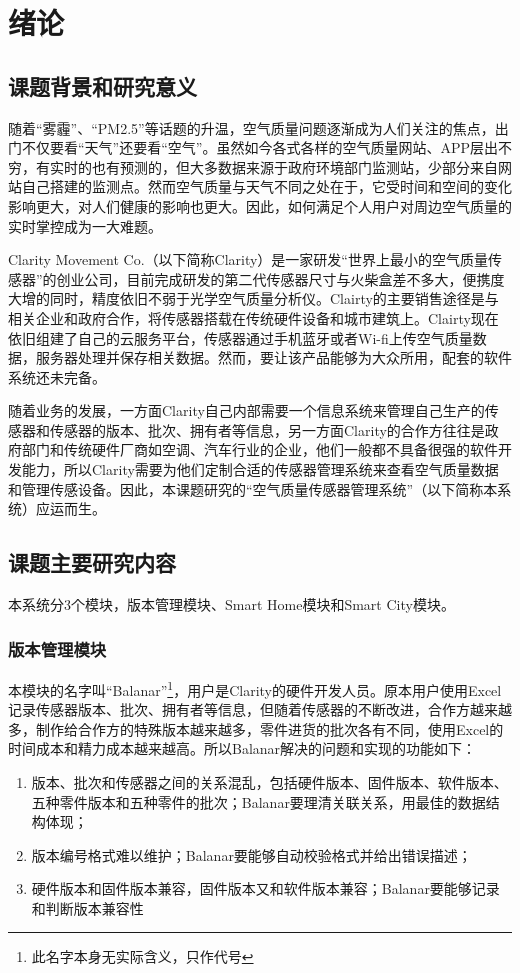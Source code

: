
\chapter{绪论}
\label{chap:intro}
\section{课题背景和研究意义}
随着“雾霾”、“PM2.5”等话题的升温，空气质量问题逐渐成为人们关注的焦点，出门不仅要看“天气”还要看“空气”。虽然如今各式各样的空气质量网站、APP层出不穷，有实时的也有预测的，但大多数据来源于政府环境部门监测站，少部分来自网站自己搭建的监测点。然而空气质量与天气不同之处在于，它受时间和空间的变化影响更大，对人们健康的影响也更大。因此，如何满足个人用户对周边空气质量的实时掌控成为一大难题。

Clarity Movement Co.（以下简称Clarity）是一家研发“世界上最小的空气质量传感器”的创业公司，目前完成研发的第二代传感器尺寸与火柴盒差不多大，便携度大增的同时，精度依旧不弱于光学空气质量分析仪。Clairty的主要销售途径是与相关企业和政府合作，将传感器搭载在传统硬件设备和城市建筑上。Clairty现在依旧组建了自己的云服务平台，传感器通过手机蓝牙或者Wi-fi上传空气质量数据，服务器处理并保存相关数据。然而，要让该产品能够为大众所用，配套的软件系统还未完备。

随着业务的发展，一方面Clarity自己内部需要一个信息系统来管理自己生产的传感器和传感器的版本、批次、拥有者等信息，另一方面Clarity的合作方往往是政府部门和传统硬件厂商如空调、汽车行业的企业，他们一般都不具备很强的软件开发能力，所以Clarity需要为他们定制合适的传感器管理系统来查看空气质量数据和管理传感设备。因此，本课题研究的“空气质量传感器管理系统”（以下简称本系统）应运而生。

\section{课题主要研究内容}
本系统分3个模块，版本管理模块、Smart Home模块和Smart City模块。
\subsection{版本管理模块}
本模块的名字叫“Balanar”\footnote{此名字本身无实际含义，只作代号}，用户是Clarity的硬件开发人员。原本用户使用Excel记录传感器版本、批次、拥有者等信息，但随着传感器的不断改进，合作方越来越多，制作给合作方的特殊版本越来越多，零件进货的批次各有不同，使用Excel的时间成本和精力成本越来越高。所以Balanar解决的问题和实现的功能如下：
\begin{enumerate}
  \item 版本、批次和传感器之间的关系混乱，包括硬件版本、固件版本、软件版本、五种零件版本和五种零件的批次；Balanar要理清关联关系，用最佳的数据结构体现；
  \item 版本编号格式难以维护；Balanar要能够自动校验格式并给出错误描述；
  \item 硬件版本和固件版本兼容，固件版本又和软件版本兼容；Balanar要能够记录和判断版本兼容性
\end{enumerate}

